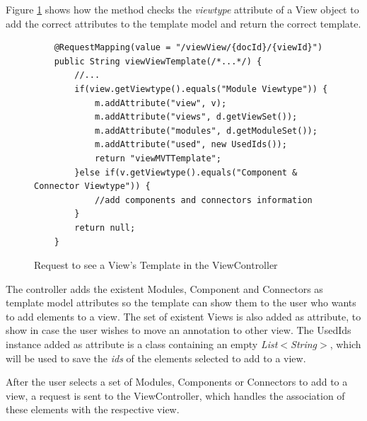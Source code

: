 Figure \ref{figure:ViewControllerViewTemplates} shows how the method checks the \textit{viewtype} attribute of a View object to add the correct attributes to the template model and return the correct template.
\begin{figure}[h]
\lstset{style=customjava}
\begin{lstlisting}
	@RequestMapping(value = "/viewView/{docId}/{viewId}")
	public String viewViewTemplate(/*...*/) {
		//...
		if(view.getViewtype().equals("Module Viewtype")) {
			m.addAttribute("view", v);
			m.addAttribute("views", d.getViewSet());
			m.addAttribute("modules", d.getModuleSet());
			m.addAttribute("used", new UsedIds());
			return "viewMVTTemplate";
		}else if(v.getViewtype().equals("Component & Connector Viewtype")) {
			//add components and connectors information
		}
		return null;
	}	
\end{lstlisting}
\caption{Request to see a View's Template in the ViewController}
\label{figure:ViewControllerViewTemplates}
\end{figure}
The controller adds the existent Modules, Component and Connectors as template model attributes so the template can show them to the user who wants to add elements to a view. The set of existent Views is also added as attribute, to show in case the user wishes to move an annotation to other view. The UsedIds instance added as attribute is a class containing an empty \textit{List$<$String$>$}, which will be used to save the \textit{ids} of the elements selected to add to a view. 
 
After the user selects a set of Modules, Components or Connectors to add to a view, a request is sent to the ViewController, which handles the association of these elements with the respective view.

